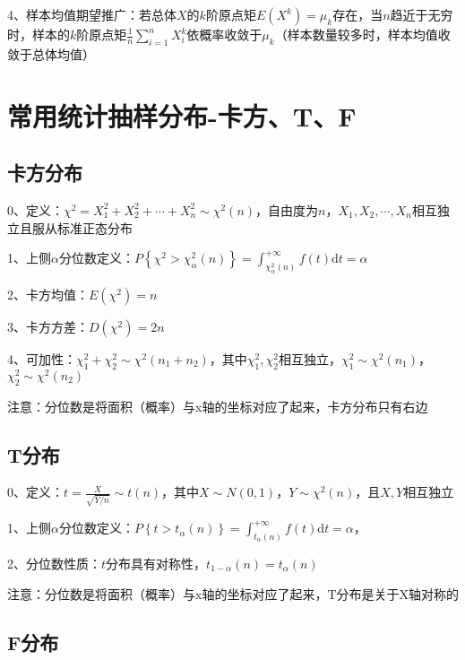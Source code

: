 4、样本均值期望推广：若总体$X$的$k$阶原点矩$E(X^k)=\mu_k$存在，当$n$趋近于无穷时，样本的$k$阶原点矩$\frac{1}{n}\sum_{i=1}^{n}X_i^k$依概率收敛于$\mu_k$（样本数量较多时，样本均值收敛于总体均值）

\section{常用统计抽样分布-卡方、T、F}



\subsection{卡方分布}

0、定义：$\chi^{2} = X_1^2+X_2^2+\cdots+X_n^2 \sim \chi^{2}(n)$，自由度为$n$，$X_1,X_2,\cdots ,X_n$相互独立且服从标准正态分布

1、上侧$\alpha$分位数定义：$P\left\{\chi^{2}>\chi_{\alpha}^{2}(n)\right\}=\int_{\chi_{\alpha}^{2}(n)}^{+\infty} f(t) \mathrm{d} t=\alpha$

2、卡方均值：$E\left(\chi^{2}\right)=n$

3、卡方方差：$D\left(\chi^{2}\right)=2 n$

4、可加性：$\chi_{1}^{2}+\chi_{2}^{2} \sim \chi^{2}\left(n_{1}+n_{2}\right)$，其中$\chi_{1}^{2}, \chi_{2}^{2}$相互独立，$\chi_{1}^{2} \sim \chi^{2}\left(n_{1}\right)$，$\chi_{2}^{2} \sim \chi^{2}\left(n_{2}\right)$

注意：分位数是将面积（概率）与x轴的坐标对应了起来，卡方分布只有右边



\subsection{T分布}

0、定义：$t=\frac{X}{\sqrt{Y/n}} \sim t(n)$，其中$X \sim N(0,1)$，$Y\sim \chi^{2}\left(n\right)$，且$X,Y$相互独立

1、上侧$\alpha$分位数定义：$P\left\{t>t_{\alpha}(n)\right\}=\int_{t_{\alpha}(n)}^{+\infty} f(t) \mathrm{d} t=\alpha$，

2、分位数性质：$t$分布具有对称性，$t_{1-\alpha}(n)=t_{\alpha}(n)$

注意：分位数是将面积（概率）与x轴的坐标对应了起来，T分布是关于X轴对称的



\subsection{F分布}

